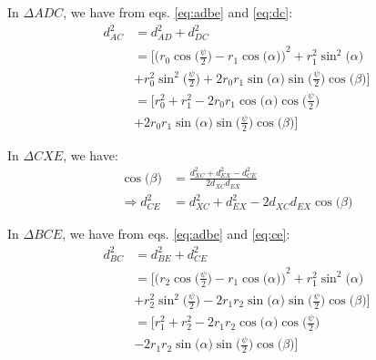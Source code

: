         In $\Delta ADC$, we have from eqs. \eqref{eq:adbe} and \eqref{eq:dc}:
        \begin{equation}
        \label{eq:ac}
            \begin{aligned}
                d_{AC}^2 &= d_{AD}^2 + d_{DC}^2\\
                &= \Bigg[ {\Big(r_0  \cos \Big(\displaystyle\frac{\psi}{2}\Big) - r_1  \cos \big(\alpha\big) \Big)}^2 + r_1^2  \sin^2 \big( \alpha \big)\\
                &+ r_0^2  \sin^2 \Big(\displaystyle\frac{\psi}{2}\Big) + 2  r_0  r_1 \sin \big( \alpha \big)  \sin \Big(\displaystyle\frac{\psi}{2}\Big)  \cos \big( \beta \big) \Bigg]\\
                &= \Bigg[ r_0^2 + r_1^2 - 2  r_0  r_1  \cos \big( \alpha \big)  \cos \Big(\displaystyle\frac{\psi}{2}\Big)\\
                &+ 2  r_0  r_1 \sin \big( \alpha \big)  \sin \Big(\displaystyle\frac{\psi}{2}\Big)  \cos \big( \beta \big) \Bigg]
            \end{aligned}
        \end{equation}

        In $\Delta CXE$, we have:
        \begin{equation}
        \label{eq:ce}
            \begin{aligned}
                \cos \big( \beta \big) &= \frac{d_{XC}^2 + d_{EX}^2 - d_{CE}^2}{2  d_{XC}  d_{EX}}\\
                \Rightarrow d_{CE}^2 &= d_{XC}^2 + d_{EX}^2 - 2  d_{XC}  d_{EX}  \cos \big( \beta \big)
            \end{aligned}
        \end{equation}

        In $\Delta BCE$, we have from eqs. \eqref{eq:adbe} and \eqref{eq:ce}:
        \begin{equation}
        \label{eq:bc}
            \begin{aligned}
                d_{BC}^2 &= d_{BE}^2 + d_{CE}^2\\
                &= \Bigg[ {\Big(r_2  \cos \Big(\displaystyle\frac{\psi}{2}\Big) - r_1  \cos \big(\alpha\big) \Big)}^2 + r_1^2  \sin^2 \big( \alpha \big)\\
                &+ r_2^2  \sin^2 \Big(\displaystyle\frac{\psi}{2}\Big) - 2  r_1  r_2 \sin \big( \alpha \big)  \sin \Big(\displaystyle\frac{\psi}{2}\Big)  \cos \big( \beta \big) \Bigg]\\
                &= \Bigg[ r_1^2 + r_2^2 - 2  r_1  r_2  \cos \big( \alpha \big)  \cos \Big(\displaystyle\frac{\psi}{2}\Big)\\
                &- 2  r_1  r_2 \sin \big( \alpha \big)  \sin \Big(\displaystyle\frac{\psi}{2}\Big)  \cos \big( \beta \big) \Bigg]
            \end{aligned}
        \end{equation}

